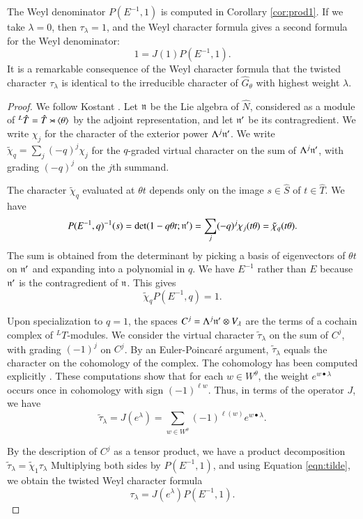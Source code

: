 The Weyl denominator $P(E^{-1},1)$ is computed in Corollary
\ref{cor:prod1}.  If we take $\lambda=0$, then $\tau_\lambda=1$, and
the Weyl character formula gives a second formula for the Weyl
denominator:
\begin{equation}\label{eqn:wd2}
1= J(1) P(E^{-1},1).
\end{equation}
It is a remarkable consequence of the Weyl character formula that the
twisted character $\tau_\lambda$ is identical to the irreducible
character of $\hat G_\theta$ with highest weight $\lambda$.


\begin{proof} 
  We follow Kostant \cite{kostant1961lie}.  Let ${\mathfrak n}$ be the Lie
  algebra of $\hat N$, considered as a module of ${}^L\hat T=\hat
  T\rtimes\langle{\theta}\rangle$ by the adjoint representation, and let ${\mathfrak n}'$
  be its contragredient.  We write $\chi_j$ for the character of the
  exterior power $\Lambda^j {\mathfrak n}'$.  We write $\tilde\chi_q = \sum_j
  (-q)^j\chi_j$ for the $q$-graded virtual character on the sum of
  $\Lambda^j {\mathfrak n}'$, with grading $(-q)^j$ on the $j$th summand.

  The character $\tilde\chi_q$ evaluated at $\theta t$ depends only on
  the image $s\in\hat S$ of $t\in \hat T$.  We have
\[
P(E^{-1},q)^{-1}(s) = \det(1- q\theta t;{\mathfrak n}') 
= \sum_j (-q)^j \chi_j(t\theta) = \tilde\chi_q(t\theta).
\]
The sum is obtained from the determinant by picking a basis of
eigenvectors of $\theta t$ on ${\mathfrak n}'$ and expanding into a polynomial in
$q$.  We have $E^{-1}$ rather than $E$ because ${\mathfrak n}'$ is the
contragredient of ${\mathfrak n}$.  This gives
\begin{equation}\label{eqn:tilde}
\tilde\chi_q P(E^{-1},q) = 1.
\end{equation}

Upon specialization to $q=1$, the spaces $C^j=\Lambda^j {\mathfrak n}'\otimes
V_\lambda$ are the terms of a cochain complex of ${}^LT$-modules.  We
consider the virtual character $\tilde \tau_\lambda$ on the sum of
$C^j$, with grading $(-1)^j$ on $C^j$.  By an Euler-Poincar\'e
argument, $\tilde\tau_\lambda$ equals the character on the cohomology
of the complex.  The cohomology has been computed explicitly
\cite{kostant1961lie}.  These computations show that for each $w\in
W^\theta$, the weight $e^{w\bullet \lambda}$ occurs once in cohomology
with sign $(-1)^{\ell w}$.  Thus, in terms of the operator $J$, we
have
\[
\tilde \tau_\lambda = J(e^\lambda) 
= \sum_{w\in W^\theta} (-1)^{\ell(w)} e^{w\bullet\lambda}.
\]

By the description of $C^j$ as a tensor product, we have a product
decomposition $\tilde \tau_\lambda = \tilde \chi_{1}\tau_\lambda $
Multiplying both sides by $P(E^{-1},1)$, and using Equation
\ref{eqn:tilde}, we obtain the twisted Weyl character formula
\begin{equation}
\tau_\lambda = J(e^\lambda) P(E^{-1},1).
\end{equation}
\end{proof}

